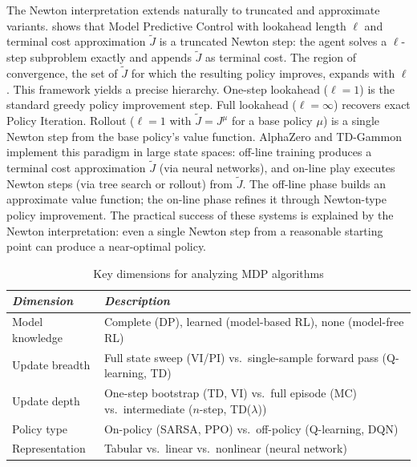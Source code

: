The Newton interpretation extends naturally to truncated and approximate variants. \citet{bertsekas2024} shows that Model Predictive Control with lookahead length $\ell$ and terminal cost approximation $\tilde{J}$ is a truncated Newton step: the agent solves a $\ell$-step subproblem exactly and appends $\tilde{J}$ as terminal cost. The region of convergence, the set of $\tilde{J}$ for which the resulting policy improves, expands with $\ell$. This framework yields a precise hierarchy. One-step lookahead ($\ell = 1$) is the standard greedy policy improvement step. Full lookahead ($\ell = \infty$) recovers exact Policy Iteration. Rollout ($\ell = 1$ with $\tilde{J} = J^\mu$ for a base policy $\mu$) is a single Newton step from the base policy's value function. AlphaZero and TD-Gammon implement this paradigm in large state spaces: off-line training produces a terminal cost approximation $\tilde{J}$ (via neural networks), and on-line play executes Newton steps (via tree search or rollout) from $\tilde{J}$. The off-line phase builds an approximate value function; the on-line phase refines it through Newton-type policy improvement. The practical success of these systems is explained by the Newton interpretation: even a single Newton step from a reasonable starting point can produce a near-optimal policy.

\begin{table}[h!]
\centering
\caption{Key dimensions for analyzing MDP algorithms \citep{moerland2022unifying}}
\label{tab:dimensions}
\begin{tabular}{p{2.5cm}|p{8.5cm}}
\hline
\textit{Dimension} & \textit{Description} \\
\hline
Model knowledge & Complete (DP), learned (model-based RL), none (model-free RL) \\
\hline
Update breadth & Full state sweep (VI/PI) vs.\ single-sample forward pass (Q-learning, TD) \\
\hline
Update depth & One-step bootstrap (TD, VI) vs.\ full episode (MC) vs.\ intermediate ($n$-step, TD($\lambda$)) \\
\hline
Policy type & On-policy (SARSA, PPO) vs.\ off-policy (Q-learning, DQN) \\
\hline
Representation & Tabular vs.\ linear vs.\ nonlinear (neural network) \\
\hline
\end{tabular}
\end{table}

